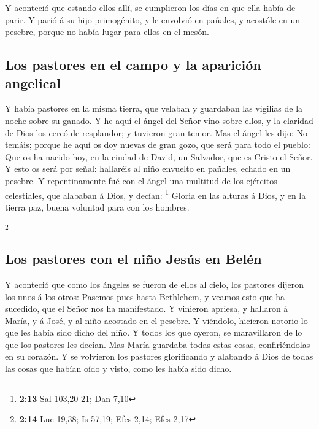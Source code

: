  Y aconteció que estando ellos allí, se cumplieron los días
en que ella había de parir.  Y parió á su hijo primogénito,
y le envolvió en pañales, y acostóle en un pesebre, porque no había
lugar para ellos en el mesón.

\hypertarget{los-pastores-en-el-campo-y-la-apariciuxf3n-angelical}{%
\subsection{Los pastores en el campo y la aparición
angelical}\label{los-pastores-en-el-campo-y-la-apariciuxf3n-angelical}}

 Y había pastores en la misma tierra, que velaban y
guardaban las vigilias de la noche sobre su ganado.  Y he
aquí el ángel del Señor vino sobre ellos, y la claridad de Dios los
cercó de resplandor; y tuvieron gran temor.  Mas el ángel
les dijo: No temáis; porque he aquí os doy nuevas de gran gozo, que será
para todo el pueblo:  Que os ha nacido hoy, en la ciudad de
David, un Salvador, que es Cristo el Señor.  Y esto os será
por señal: hallaréis al niño envuelto en pañales, echado en un pesebre.
 Y repentinamente fué con el ángel una multitud de los
ejércitos celestiales, que alababan á Dios, y decían: \footnote{\textbf{2:13}
  Sal 103,20-21; Dan 7,10}  Gloria en las alturas á Dios, y
en la tierra paz, buena voluntad para con los hombres.

\footnote{\textbf{2:14} Luc 19,38; Is 57,19; Efes 2,14; Efes 2,17}

\hypertarget{los-pastores-con-el-niuxf1o-jesuxfas-en-beluxe9n}{%
\subsection{Los pastores con el niño Jesús en
Belén}\label{los-pastores-con-el-niuxf1o-jesuxfas-en-beluxe9n}}

 Y aconteció que como los ángeles se fueron de ellos al
cielo, los pastores dijeron los unos á los otros: Pasemos pues hasta
Bethlehem, y veamos esto que ha sucedido, que el Señor nos ha
manifestado.  Y vinieron apriesa, y hallaron á María, y á
José, y al niño acostado en el pesebre.  Y viéndolo,
hicieron notorio lo que les había sido dicho del niño.  Y
todos los que oyeron, se maravillaron de lo que los pastores les decían.
 Mas María guardaba todas estas cosas, confiriéndolas en su
corazón.  Y se volvieron los pastores glorificando y
alabando á Dios de todas las cosas que habían oído y visto, como les
había sido dicho.

